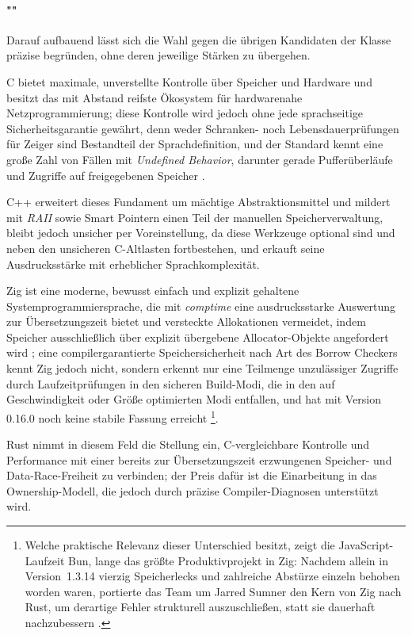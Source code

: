 \paragraph{""}
Darauf aufbauend lässt sich die Wahl gegen die übrigen Kandidaten der
Klasse präzise begründen, ohne deren jeweilige Stärken zu übergehen.

C bietet maximale, unverstellte Kontrolle über Speicher und Hardware und besitzt das mit Abstand reifste
Ökosystem für hardwarenahe Netzprogrammierung; diese Kontrolle wird jedoch ohne jede sprachseitige
Sicherheitsgarantie gewährt, denn weder Schranken- noch Lebensdauerprüfungen für Zeiger sind Bestandteil
der Sprachdefinition, und der Standard kennt eine große Zahl von Fällen mit \textit{Undefined Behavior},
darunter gerade Pufferüberläufe und Zugriffe auf freigegebenen Speicher \cite{iso-c}.

C++ erweitert dieses Fundament um mächtige Abstraktionsmittel und mildert mit \textit{RAII} sowie Smart Pointern einen
Teil der manuellen Speicherverwaltung, bleibt jedoch unsicher per Voreinstellung, da diese Werkzeuge optional sind und
neben den unsicheren C-Altlasten fortbestehen, und erkauft seine Ausdrucksstärke mit erheblicher Sprachkomplexität.

Zig ist eine moderne, bewusst einfach und explizit gehaltene Systemprogrammiersprache, die mit \textit{comptime} eine
ausdrucksstarke Auswertung zur Übersetzungszeit bietet und versteckte Allokationen vermeidet, indem Speicher
ausschließlich über explizit übergebene Allocator-Objekte angefordert wird \cite{zig-lang}; eine compilergarantierte
Speichersicherheit nach Art des Borrow Checkers kennt Zig jedoch nicht, sondern erkennt nur eine Teilmenge
unzulässiger Zugriffe durch Laufzeitprüfungen in den sicheren Build-Modi, die in den auf Geschwindigkeit oder Größe
optimierten Modi entfallen, und hat mit Version 0.16.0 noch keine stabile Fassung erreicht
\cite{zig-lang}\footnote{Welche praktische Relevanz dieser Unterschied besitzt, zeigt die JavaScript-Laufzeit Bun,
lange das größte Produktivprojekt in Zig: Nachdem allein in Version~1.3.14 vierzig Speicherlecks und zahlreiche
Abstürze einzeln behoben worden waren, portierte das Team um Jarred Sumner den Kern von Zig nach Rust, um derartige
Fehler strukturell auszuschließen, statt sie dauerhaft nachzubessern \cite{bun-rust-port}.}.

Rust nimmt in diesem Feld die Stellung ein, C-vergleichbare Kontrolle und Performance mit einer bereits
zur Übersetzungszeit erzwungenen Speicher- und Data-Race-Freiheit zu verbinden; der Preis dafür ist die
Einarbeitung in das Ownership-Modell, die jedoch durch präzise Compiler-Diagnosen unterstützt wird.

